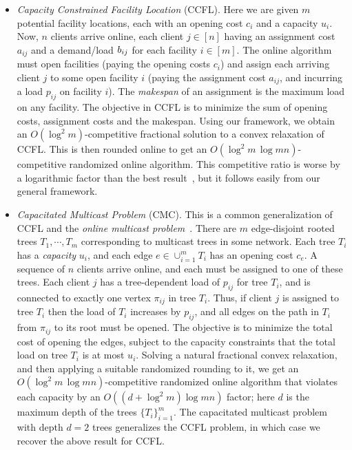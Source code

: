 \documentclass[letterpaper,11pt]{article}
\begin{document}
\begin{itemize}
\item {\em Capacity Constrained Facility Location} (CCFL). Here we are
  given $m$ potential facility locations, each with an opening cost $c_i$
  and a capacity $u_i$. Now, $n$ clients arrive online, each client $j\in
  [n]$ having an assignment cost $a_{ij}$ and a demand/load $b_{ij}$ for
  each facility $i\in[m]$. The online algorithm must open facilities
  (paying the opening costs $c_i$) and assign each arriving client $j$
  to some open facility $i$ (paying the assignment cost $a_{ij}$, and
  incurring a load $p_{ij}$ on facility $i$). The \emph{makespan} of an
  assignment is the maximum load on any facility. The objective in CCFL
  is to minimize the sum of opening costs, assignment costs and the
  makespan. Using our framework, we obtain an $O(\log^2m)$-competitive
  fractional solution to a convex relaxation of CCFL. This is then
  rounded online to get an $O(\log^2m\,\log mn)$-competitive randomized
  online algorithm. This competitive ratio is worse by a logarithmic
  factor than the best result~\cite{ABFP13}, but it follows easily from
  our general framework.

\item {\em Capacitated Multicast Problem} (CMC).  This is a common
  generalization of CCFL and the \emph{online multicast
    problem}~\cite{AAABN-talg06}. There are $m$ edge-disjoint rooted
  trees $T_1,\cdots,T_m$ corresponding to multicast trees in some
  network. Each tree $T_i$ has a {\em capacity} $u_i$, and each edge
  $e\in \cup_{i=1}^m T_i$ has an opening cost $c_e$. A sequence of $n$
  clients arrive online, and each must be assigned to one of these
  trees. Each client $j$ has a tree-dependent load of $p_{ij}$ for tree
  $T_i$, and is connected to exactly one vertex $\pi_{ij}$ in tree
  $T_i$. Thus, if client $j$ is assigned to tree $T_i$ then the load of
  $T_i$ increases by $p_{ij}$, and all edges on the path in $T_i$ from
  $\pi_{ij}$ to its root must be opened. The objective is to minimize
  the total cost of opening the edges, subject to the capacity
  constraints that the total load on tree $T_i$ is at most $u_i$.
  Solving a natural fractional convex relaxation, and then applying a
  suitable randomized rounding to it, we get an $O(\log^2m\,\log
  mn)$-competitive randomized online algorithm that violates each
  capacity by an $O((d+\log^2m)\log mn)$ factor; here $d$ is the maximum
  depth of the trees $\{T_i\}_{i=1}^m$. The capacitated multicast
  problem with depth $d=2$ trees generalizes the CCFL problem, in which
  case we recover the above result for CCFL.


\end{itemize}
\end{document}
